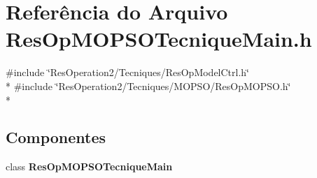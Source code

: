 \section{Referência do Arquivo Res\+Op\+M\+O\+P\+S\+O\+Tecnique\+Main.\+h}
\label{_2_tecniques_2_m_o_p_s_o_2_res_op_m_o_p_s_o_tecnique_main_8h}
{\ttfamily \#include \char`\"{}Res\+Operation2/\+Tecniques/\+Res\+Op\+Model\+Ctrl.\+h\char`\"{}}\\*
{\ttfamily \#include \char`\"{}Res\+Operation2/\+Tecniques/\+M\+O\+P\+S\+O/\+Res\+Op\+M\+O\+P\+S\+O.\+h\char`\"{}}\\*
\subsection*{Componentes}
\begin{DoxyCompactItemize}
\item 
class {\bf Res\+Op\+M\+O\+P\+S\+O\+Tecnique\+Main}
\end{DoxyCompactItemize}
